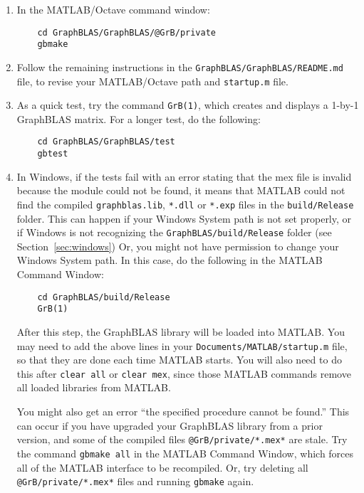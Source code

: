 \documentclass[12pt]{article}
\begin{document}
\begin{enumerate}
\item In the MATLAB/Octave command window:

    {\small
    \begin{verbatim}
    cd GraphBLAS/GraphBLAS/@GrB/private
    gbmake \end{verbatim} }

\item Follow the remaining instructions in the
    \verb'GraphBLAS/GraphBLAS/README.md' file, to revise your
    MATLAB/Octave path and \verb'startup.m' file.

\item As a quick test, try the command \verb'GrB(1)', which
    creates and displays a 1-by-1 GraphBLAS matrix.  For a longer test, do the
    following:

    {\small
    \begin{verbatim}
    cd GraphBLAS/GraphBLAS/test
    gbtest \end{verbatim} }

\item In Windows, if the tests fail with an error stating that the
    mex file is invalid because the module could not be found, it means
    that MATLAB could not find the compiled \verb'graphblas.lib', \verb'*.dll'
    or \verb'*.exp' files in the \verb'build/Release' folder.  This can happen
    if your Windows System path is not set properly, or if Windows is not
    recognizing the \verb'GraphBLAS/build/Release' folder (see
    Section~\ref{sec:windows})  Or, you might not have permission to change your
    Windows System path.  In this case, do the following in the MATLAB Command
    \vspace{-0.1in}
    Window:

    \vspace{-0.1in}
    {\small
    \begin{verbatim}
    cd GraphBLAS/build/Release
    GrB(1) \end{verbatim} }

    \vspace{-0.1in}
    After this step, the GraphBLAS library will be loaded into MATLAB.  You may
    need to add the above lines in your \verb'Documents/MATLAB/startup.m' file,
    so that they are done each time MATLAB starts.  You will also need to do
    this after \verb'clear all' or \verb'clear mex', since those MATLAB
    commands remove all loaded libraries from MATLAB.

    You might also get an error ``the specified procedure cannot be found.''
    This can occur if you have upgraded your GraphBLAS library from a prior
    version, and some of the compiled files \verb'@GrB/private/*.mex*'
    are stale.  Try the command \verb'gbmake all' in the MATLAB Command
    Window, which forces all of the MATLAB interface to be recompiled.
    Or, try deleting all \verb'@GrB/private/*.mex*' files and running
    \verb'gbmake' again.


\end{enumerate}
\end{document}
